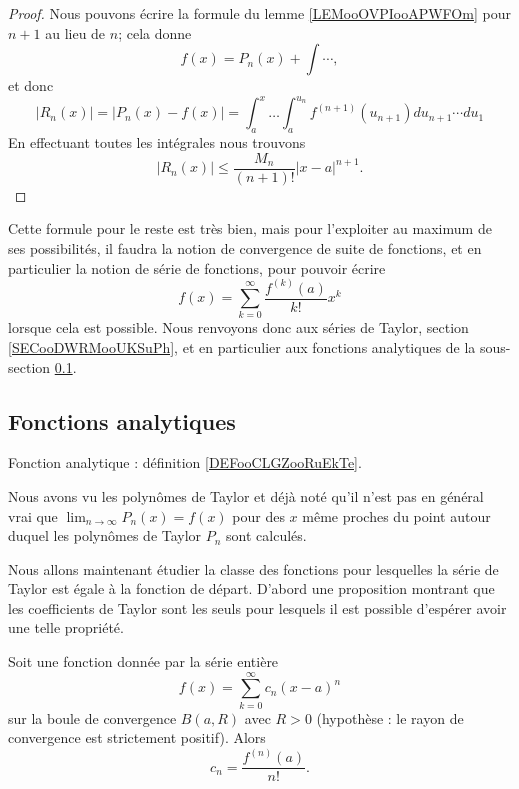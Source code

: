 \begin{proof}
	Nous pouvons écrire la formule du lemme \ref{LEMooOVPIooAPWFOm} pour \( n+1\) au lieu de \( n\); cela donne
	\begin{equation}
		f(x)=P_n(x)+\int\cdots,
	\end{equation}
	et donc
	\begin{equation}
		| R_n(x) |=| P_n(x)-f(x) |=\int_a^x\ldots\int_a^{u_n}f^{(n+1)}(u_{n+1})du_{n+1}\cdots du_{1}
	\end{equation}
	En effectuant toutes les intégrales nous trouvons
	\begin{equation}
		| R_n(x) |\leq \frac{ M_n }{ (n+1)! }| x-a |^{n+1}.
	\end{equation}
\end{proof}
Cette formule pour le reste est très bien, mais pour l'exploiter au maximum de ses possibilités, il faudra la notion de convergence de suite de fonctions, et en particulier la notion de série de fonctions, pour pouvoir écrire
\begin{equation}
	f(x)=\sum_{k=0}^{\infty}\frac{ f^{(k)}(a) }{ k! }x^k
\end{equation}
lorsque cela est possible. Nous renvoyons donc aux séries de Taylor, section \ref{SECooDWRMooUKSuPh}, et en particulier aux fonctions analytiques de la sous-section \ref{SUBSECooXKHWooEzqGRJ}.

\subsection{Fonctions analytiques}
\label{SUBSECooXKHWooEzqGRJ}

Fonction analytique : définition \ref{DEFooCLGZooRuEkTe}.

Nous avons vu les polynômes de Taylor et déjà noté qu'il n'est pas en général vrai que \( \lim_{n\to \infty} P_n(x)=f(x)\) pour des \( x\) même proches du point autour duquel les polynômes de Taylor \( P_n\) sont calculés.

Nous allons maintenant étudier la classe des fonctions pour lesquelles la série de Taylor est égale à la fonction de départ. D'abord une proposition montrant que les coefficients de Taylor sont les seuls pour lesquels il est possible d'espérer avoir une telle propriété.
\begin{proposition}      \label{PROPooTRWVooETTtbP}
	Soit une fonction donnée par la série entière
	\begin{equation}
		f(x)=\sum_{k=0}^{\infty}c_n(x-a)^n
	\end{equation}
	sur la boule de convergence \( B(a,R)\) avec \( R>0\) (hypothèse : le rayon de convergence est strictement positif). Alors
	\begin{equation}
		c_n=\frac{ f^{(n)}(a) }{ n! }.
	\end{equation}
\end{proposition}

